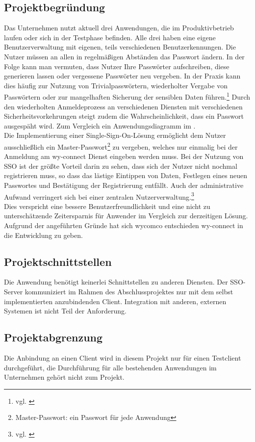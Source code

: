 \subsection{Projektbegründung} 
\label{sec:Projektbegruendung}
Das Unternehmen nutzt aktuell drei Anwendungen, die im Produktivbetrieb laufen oder sich in der Testphase befinden. Alle drei haben eine eigene Benutzerverwaltung mit eigenen, teils verschiedenen Benutzerkennungen. Die Nutzer müssen an allen in regelmäßigen Abständen das Passwort ändern. 
In der Folge kann man vermuten, dass Nutzer Ihre Passwörter aufschreiben, diese generieren lassen oder vergessene Passwörter neu vergeben. In der Praxis kann dies häufig zur Nutzung von Trivialpasswörtern, wiederholter Vergabe von Passwörtern oder zur mangelhaften Sicherung der sensiblen Daten führen.\footnote{vgl. \cite{datenschutzbeauftragter}}
Durch den wiederholten Anmeldeprozess an verschiedenen Diensten mit verschiedenen Sicherheitsvorkehrungen steigt zudem die Wahrscheinlichkeit, dass ein Passwort ausgespäht wird. 
Zum Vergleich ein Anwendungsdiagramm im . \\
Die Implementierung einer \glqq Single-Sign-On-Lösung\grqq{} ermöglicht dem Nutzer ausschließlich ein Master-Passwort\footnote{Master-Passwort: ein Passwort für jede Anwendung} zu vergeben, welches nur einmalig bei der Anmeldung am wy-connect Dienst eingeben werden muss. Bei der Nutzung von \ac{SSO} ist der größte Vorteil darin zu sehen, dass sich der Nutzer nicht nochmal registrieren muss, so dass das lästige Eintippen von Daten, Festlegen eines neuen Passwortes und Bestätigung der Registrierung entfällt. Auch der administrative Aufwand verringert sich bei einer zentralen Nutzerverwaltung.\footnote{vgl. \cite{univention}}\\
Dies verspricht eine bessere Benutzerfreundlichkeit und eine nicht zu unterschätzende Zeitersparnis für Anwender im Vergleich zur derzeitigen Lösung. 
Aufgrund der angeführten Gründe hat sich wycomco entschieden wy-connect in die Entwicklung zu geben.
\subsection{Projektschnittstellen} 
\label{sec:Projektschnittstellen}
Die Anwendung benötigt keinerlei Schnittstellen zu anderen Diensten. Der \ac{SSO}-Server kommuniziert im Rahmen des Abschlussprojektes nur mit dem selbst implementierten anzubindenden Client. 
Integration mit anderen, externen Systemen ist nicht Teil der Anforderung.
\subsection{Projektabgrenzung} 
\label{sec:Projektabgrenzung}
Die Anbindung an einen Client wird in diesem Projekt nur für einen Testclient durchgeführt, die Durchführung für alle bestehenden Anwendungen im Unternehmen gehört nicht zum Projekt.